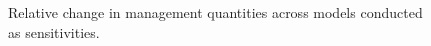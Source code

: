 \documentclass[
]{scrartcl}
\begin{document}
\clearpage

\begin{figure}


\caption{\label{fig-sens_sum}Relative change in management quantities
across models conducted as sensitivities.}

\end{figure}%
\end{document}
